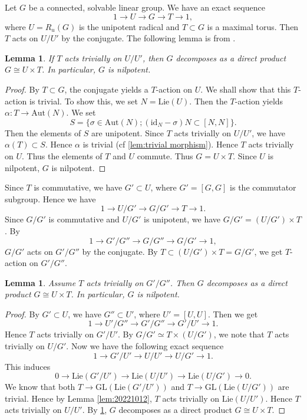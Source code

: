 \documentclass[11pt,english]{smfart}
\theoremstyle{plain}
\newtheorem{lem}[thm]{Lemma}
\theoremstyle{definition}
\theoremstyle{remark}
\numberwithin{equation}{subsection}
\theoremstyle{plain}
\begin{document}
Let $G$ be a connected, solvable linear group.
We have an exact sequence 
\begin{equation}\label{eqn:20230321}
1\to U\to G\to T\to 1,
\end{equation}
where $U=R_u(G)$ is the unipotent radical and $T\subset G$ is a maximal torus.
Then $T$ acts on $U/U'$ by the conjugate.
The following lemma is from \cite[Lemma 1.8]{AN99}. 

\begin{lem}\label{eqn:202210154}
If $T$ acts trivially on $U/U'$, then $G$ decomposes as a direct product $G \cong U \times T$.
In particular, $G$ is nilpotent. 
\end{lem}

\begin{proof}
By $T\subset G$, the conjugate yields a $T$-action on $U$.
We shall show that this $T$-action is trivial.
To show this, we set $N=\mathrm{Lie}(U)$.
Then the $T$-action yields $\alpha:T\to \mathrm{Aut}(N)$.
We set 
$$S=\{ \sigma\in \mathrm{Aut}(N); (\mathrm{id}_N-\sigma)N\subset [N,N]\}.$$
Then the elements of $S$ are unipotent.
Since $T$ acts trivially on $U/U'$, we have $\alpha(T)\subset S$.
Hence $\alpha$ is trivial (cf \cref{lem:trivial morphism}).
Hence $T$ acts trivially on $U$.
Thus the elements of $T$ and $U$ commute.
Thus $G=U\times T$.
Since $U$ is nilpotent, $G$ is nilpotent.
\end{proof}




Since $T$ is commutative, we have 
$G'\subset U$, where $G'=[G,G]$ is the commutator subgroup.
Hence we have
$$
1\to U/G'\to G/G'\to T\to 1. 
$$
Since $G/G'$ is commutative and $U/G'$ is unipotent, we have $G/G'=(U/G')\times T$. 
By
$$
1\to G'/G''\to G/G''\to G/G'\to 1,
$$
$G/G'$ acts on $G'/G''$ by the conjugate.
By $T\subset (U/G')\times T=G/G'$, we get $T$-action on $G'/G''$. 


\begin{lem}\label{claim:202210121}
Assume $T$ acts trivially on $G'/G''$.
Then $G$ decomposes as a direct product $G \cong U \times T$.
In particular, $G$ is nilpotent. 
\end{lem} 

\begin{proof}
By $G'\subset U$, we have $G''\subset U'$, where $U'=[U,U]$.
Then we get
$$
1\to U'/G''\to G'/G''\to G'/U'\to 1.
$$
Hence $T$ acts trivially on $G'/U'$.
By $G/G'\simeq T\times (U/G')$, we note that $T$ acts trivially on $U/G'$.
Now we have the following exact sequence
$$
1\to G'/U'\to U/U'\to U/G'\to 1.
$$
This induces
$$
0\to \mathrm{Lie}(G'/U')\to \mathrm{Lie}(U/U')\to \mathrm{Lie}(U/G')\to 0.
$$
We know that both $T\to \mathrm{GL}(\mathrm{Lie}(G'/U'))$ and $T\to \mathrm{GL}(\mathrm{Lie}(U/G'))$ are trivial.
Hence by Lemma \ref{lem:20221012}, $T$ acts trivially on $\mathrm{Lie}(U/U')$.
Hence $T$ acts trivially on $U/U'$.
By \cref{eqn:202210154}, $G$ decomposes as a direct product $G \cong U \times T$.
\end{proof}
\end{document}
